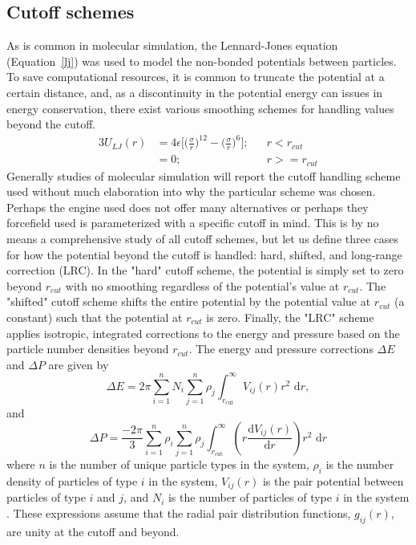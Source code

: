 \subsection{Cutoff schemes}\label{sec:cutoff}

As is common in molecular simulation, the Lennard-Jones equation (Equation~\eqref{lj}) was used to model the non-bonded potentials between particles.
To save computational resources, it is common to truncate the potential at a certain distance, and, as a discontinuity in the potential energy can issues in energy conservation, there exist various smoothing schemes for handling values beyond the cutoff.
\begin{alignat}{3}
U_{LJ}(r) & = 4\epsilon\bigg[\bigg(\frac{\sigma}{r}\bigg)^{12} - \bigg(\frac{\sigma}{r}\bigg)^{6}\bigg]; && r<r_{cut} 
    \label{lj} \\
& = 0; && r>=r_{cut}
    \nonumber
\end{alignat}
Generally studies of molecular simulation will report the cutoff handling scheme used without much elaboration into why the particular scheme was chosen.
Perhaps the engine used does not offer many alternatives or perhaps they forcefield used is parameterized with a specific cutoff in mind.
This is by no means a comprehensive study of all cutoff schemes, but let us define three cases for how the potential beyond the cutoff is handled: hard, shifted, and long-range correction (LRC). 
In the "hard" cutoff scheme, the potential is simply set to zero beyond $r_{cut}$ with no smoothing regardless of the potential’s value at $r_{cut}$.
The "shifted" cutoff scheme shifts the entire potential by the potential value at $r_{cut}$ (a constant) such that the potential at $r_{cut}$ is zero.
Finally, the "LRC" scheme applies isotropic, integrated corrections to the energy and pressure based on the particle number densities beyond $r_{cut}$.
The energy and pressure corrections $\Delta E$ and $\Delta P$ are given by
\begin{equation}\label{lrc_e}
    \Delta E = 2\pi \sum_{i=1}^{n} N_i \sum_{j=1}^{n} \rho_j
    \int_{r_\mathrm{cut}}^{\infty} V_{ij}(r) r^2\,\,\mathrm{d}r, 
\end{equation}
and
\begin{equation}\label{lrc_p}
    \Delta P = \frac{-2\pi}{3} \sum_{i=1}^{n} \rho_i \sum_{j=1}^{n} \rho_j
    \int_{r_\mathrm{cut}}^{\infty} \left( r
    \frac{\mathrm{d}V_{ij}(r)}{\mathrm{d}r} \right) r^2 \,\,\mathrm{d}r  
\end{equation}
where $n$ is the number of unique particle types in the system, $\rho_{i}$ is the number density of particles of type $i$ in the system, $V_{ij}(r)$ is the pair potential between particles of type $i$ and $j$, and $N_{i}$ is the number of particles of type $i$ in the system \citep{frenkel2001understanding, Sun1998}.
These expressions assume that the radial pair distribution functions, $g_{ij}(r)$, are unity at the cutoff and beyond. 

